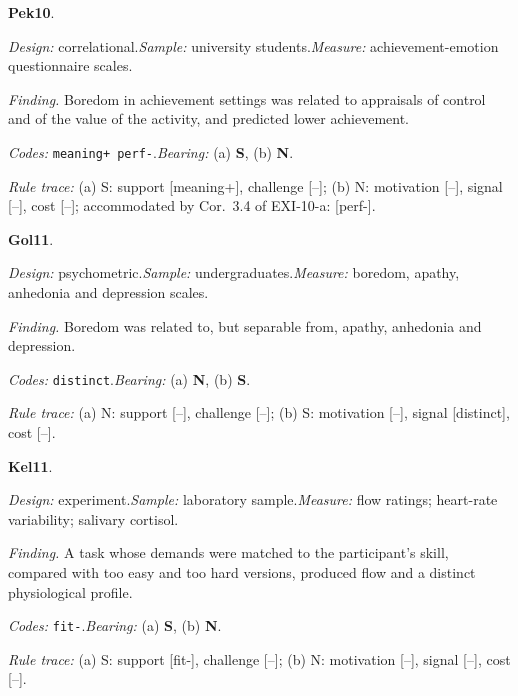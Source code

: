 \medskip
{}
\noindent\textbf{Pek10}\enspace \citet{Pekrun2010}.\par
{\small\noindent\textit{Design:} correlational.\quad \textit{Sample:} university students.\quad \textit{Measure:} achievement-emotion questionnaire scales.\par
\noindent\textit{Finding.} Boredom in achievement settings was related to appraisals of control and of the value of the activity, and predicted lower achievement.\par
\noindent\textit{Codes:} \texttt{meaning+ perf-}.\quad \textit{Bearing:} (a) \textbf{S}, (b) \textbf{N}.\par
\noindent\textit{Rule trace:} (a) S: support {[}meaning+{]}, challenge {[}--{]}; (b) N: motivation {[}--{]}, signal {[}--{]}, cost {[}--{]}; accommodated by Cor.~3.4 of EXI-10-a: {[}perf-{]}.\par}
\medskip
{}
\noindent\textbf{Gol11}\enspace \citet{Goldberg2011}.\par
{\small\noindent\textit{Design:} psychometric.\quad \textit{Sample:} undergraduates.\quad \textit{Measure:} boredom, apathy, anhedonia and depression scales.\par
\noindent\textit{Finding.} Boredom was related to, but separable from, apathy, anhedonia and depression.\par
\noindent\textit{Codes:} \texttt{distinct}.\quad \textit{Bearing:} (a) \textbf{N}, (b) \textbf{S}.\par
\noindent\textit{Rule trace:} (a) N: support {[}--{]}, challenge {[}--{]}; (b) S: motivation {[}--{]}, signal {[}distinct{]}, cost {[}--{]}.\par}
\medskip
{}
\noindent\textbf{Kel11}\enspace \citet{Keller2011}.\par
{\small\noindent\textit{Design:} experiment.\quad \textit{Sample:} laboratory sample.\quad \textit{Measure:} flow ratings; heart-rate variability; salivary cortisol.\par
\noindent\textit{Finding.} A task whose demands were matched to the participant's skill, compared with too easy and too hard versions, produced flow and a distinct physiological profile.\par
\noindent\textit{Codes:} \texttt{fit-}.\quad \textit{Bearing:} (a) \textbf{S}, (b) \textbf{N}.\par
\noindent\textit{Rule trace:} (a) S: support {[}fit-{]}, challenge {[}--{]}; (b) N: motivation {[}--{]}, signal {[}--{]}, cost {[}--{]}.\par}

